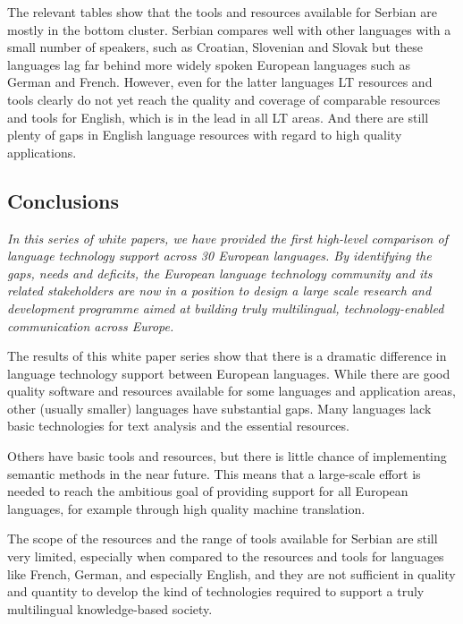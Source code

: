 \begin{multicols}{2}
The relevant tables show that the tools and resources available for Serbian are mostly in the bottom cluster. Serbian compares well with other languages with a small number of speakers, such as Croatian, Slovenian and Slovak but these languages lag far behind more widely spoken European languages such as German and French. However, even for the latter languages LT resources and tools clearly do not yet reach the quality and coverage of comparable resources and tools for English, which is in the lead in all LT areas. And there are still plenty of gaps in English language resources with regard to high quality applications.


 \subsection {Conclusions}
   
\emph{In this series of white papers, we have provided the first high-level comparison of language technology support across 30 European languages.
By identifying the gaps, needs and deficits, the European language technology community and its related stakeholders are now in a position to design a large scale research and development programme aimed at building truly multilingual, technology-enabled communication across Europe.}

The results of this white paper series show that there is a dramatic difference in language technology support between  European languages. While there are good quality software and resources available for some languages and application areas, other (usually smaller) languages have substantial gaps. Many languages lack basic technologies for text analysis and the essential resources. 

Others have basic tools and resources, but there is little chance of implementing semantic methods in the near future. This means that a large-scale effort is needed to reach the ambitious goal of providing support for all European languages, for example through high quality machine translation.

The scope of the resources and the range of tools available for Serbian are still very limited, especially when compared to the resources and tools for languages like French, German, and especially English, and they are not sufficient in quality and quantity to develop the kind of technologies required to support a truly multilingual knowledge-based society. 


\end{multicols}

